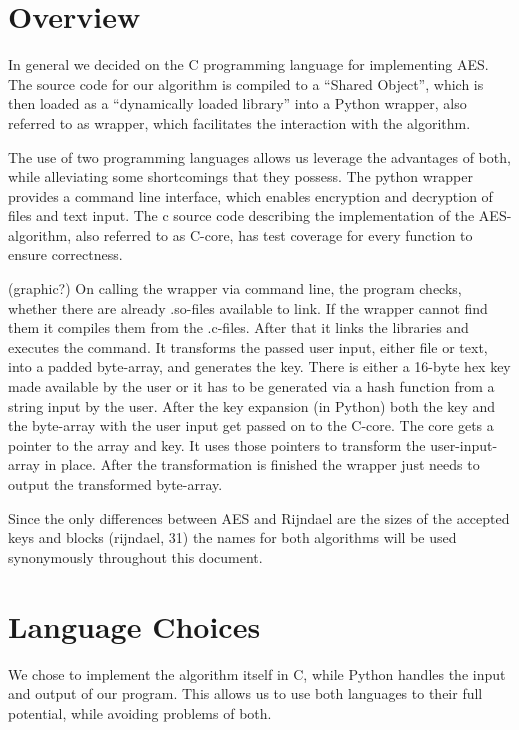 \hypertarget{overview}{%
\section{Overview}\label{overview}}

In general we decided on the C programming language for implementing
AES. The source code for our algorithm is compiled to a ``Shared
Object'', which is then loaded as a ``dynamically loaded library'' into
a Python wrapper, also referred to as wrapper, which facilitates the
interaction with the algorithm.

The use of two programming languages allows us leverage the advantages
of both, while alleviating some shortcomings that they possess. The
python wrapper provides a command line interface, which enables
encryption and decryption of files and text input. The c source code
describing the implementation of the AES-algorithm, also referred to as
C-core, has test coverage for every function to ensure correctness.

(graphic?) On calling the wrapper via command line, the program checks,
whether there are already .so-files available to link. If the wrapper
cannot find them it compiles them from the .c-files. After that it links
the libraries and executes the command. It transforms the passed user
input, either file or text, into a padded byte-array, and generates the
key. There is either a 16-byte hex key made available by the user or it
has to be generated via a hash function from a string input by the user.
After the key expansion (in Python) both the key and the byte-array with
the user input get passed on to the C-core. The core gets a pointer to
the array and key. It uses those pointers to transform the
user-input-array in place. After the transformation is finished the
wrapper just needs to output the transformed byte-array.

Since the only differences between AES and Rijndael are the sizes of the
accepted keys and blocks (rijndael, 31) the names for both algorithms
will be used synonymously throughout this document.

\hypertarget{language-choices}{%
\section{Language Choices}\label{language-choices}}

We chose to implement the algorithm itself in C, while Python handles
the input and output of our program. This allows us to use both
languages to their full potential, while avoiding problems of both.

